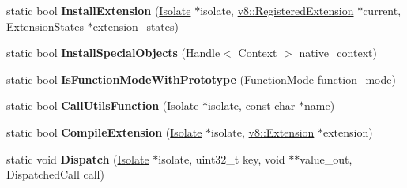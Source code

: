 \begin{DoxyCompactItemize}
\item 
static bool {\bfseries Install\+Extension} (\hyperlink{classv8_1_1internal_1_1_isolate}{Isolate} $\ast$isolate, \hyperlink{classv8_1_1_registered_extension}{v8\+::\+Registered\+Extension} $\ast$current, \hyperlink{classv8_1_1internal_1_1_b_a_s_e___e_m_b_e_d_d_e_d_1_1_extension_states}{Extension\+States} $\ast$extension\+\_\+states)\hypertarget{classv8_1_1internal_1_1_b_a_s_e___e_m_b_e_d_d_e_d_af88c978f5dc68afcfd35dd1fb74d64ce}{}\label{classv8_1_1internal_1_1_b_a_s_e___e_m_b_e_d_d_e_d_af88c978f5dc68afcfd35dd1fb74d64ce}

\item 
static bool {\bfseries Install\+Special\+Objects} (\hyperlink{classv8_1_1internal_1_1_handle}{Handle}$<$ \hyperlink{classv8_1_1internal_1_1_context}{Context} $>$ native\+\_\+context)\hypertarget{classv8_1_1internal_1_1_b_a_s_e___e_m_b_e_d_d_e_d_a885b579bd769ece428636f04c71bf58f}{}\label{classv8_1_1internal_1_1_b_a_s_e___e_m_b_e_d_d_e_d_a885b579bd769ece428636f04c71bf58f}

\item 
static bool {\bfseries Is\+Function\+Mode\+With\+Prototype} (Function\+Mode function\+\_\+mode)\hypertarget{classv8_1_1internal_1_1_b_a_s_e___e_m_b_e_d_d_e_d_a8e3d96b09678b74e20c107d3393c7e23}{}\label{classv8_1_1internal_1_1_b_a_s_e___e_m_b_e_d_d_e_d_a8e3d96b09678b74e20c107d3393c7e23}

\item 
static bool {\bfseries Call\+Utils\+Function} (\hyperlink{classv8_1_1internal_1_1_isolate}{Isolate} $\ast$isolate, const char $\ast$name)\hypertarget{classv8_1_1internal_1_1_b_a_s_e___e_m_b_e_d_d_e_d_ab40396de62a127a2984c99b0f6ad4aea}{}\label{classv8_1_1internal_1_1_b_a_s_e___e_m_b_e_d_d_e_d_ab40396de62a127a2984c99b0f6ad4aea}

\item 
static bool {\bfseries Compile\+Extension} (\hyperlink{classv8_1_1internal_1_1_isolate}{Isolate} $\ast$isolate, \hyperlink{classv8_1_1_extension}{v8\+::\+Extension} $\ast$extension)\hypertarget{classv8_1_1internal_1_1_b_a_s_e___e_m_b_e_d_d_e_d_add2fcc203ce5045e2657420d92b3fdd9}{}\label{classv8_1_1internal_1_1_b_a_s_e___e_m_b_e_d_d_e_d_add2fcc203ce5045e2657420d92b3fdd9}

\item 
static void {\bfseries Dispatch} (\hyperlink{classv8_1_1internal_1_1_isolate}{Isolate} $\ast$isolate, uint32\+\_\+t key, void $\ast$$\ast$value\+\_\+out, Dispatched\+Call call)\hypertarget{classv8_1_1internal_1_1_b_a_s_e___e_m_b_e_d_d_e_d_a0b8b738f7f7770498d81f1fa69743d16}{}\label{classv8_1_1internal_1_1_b_a_s_e___e_m_b_e_d_d_e_d_a0b8b738f7f7770498d81f1fa69743d16}


\end{DoxyCompactItemize}
